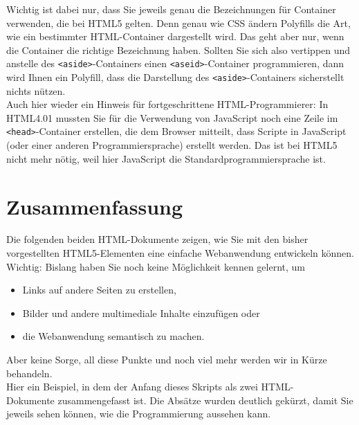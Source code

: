Wichtig ist dabei nur, dass Sie jeweils genau die Bezeichnungen für Container verwenden, die bei HTML5 gelten. Denn genau wie CSS ändern Polyfills die Art, wie ein bestimmter HTML-Container dargestellt wird. Das geht aber nur, wenn die Container die richtige Bezeichnung haben. Sollten Sie sich also vertippen und anstelle des \verb|<aside>|-Containers einen \verb|<aseid>|-Container programmieren, dann wird Ihnen ein Polyfill, dass die Darstellung des \verb|<aside>|-Containers sicherstellt nichts nützen.\\

Auch hier wieder ein Hinweis für fortgeschrittene HTML-Programmierer: In HTML4.01 mussten Sie für die Verwendung von JavaScript noch eine Zeile im \verb|<head>|-Container erstellen, die dem Browser mitteilt, dass \glqq{}Scripte\grqq{} in JavaScript (oder einer anderen Programmiersprache) erstellt werden. Das ist bei HTML5 nicht mehr nötig, weil hier JavaScript die Standardprogrammiersprache ist.

\section{Zusammenfassung}

Die folgenden beiden HTML-Dokumente zeigen, wie Sie mit den bisher vorgestellten HTML5-Elementen eine einfache Webanwendung entwickeln können. Wichtig: Bislang haben Sie noch keine Möglichkeit kennen gelernt, um

\begin{itemize}
	\item Links auf andere Seiten zu erstellen,
	\item Bilder und andere multimediale Inhalte einzufügen oder
	\item die Webanwendung semantisch zu machen.
\end{itemize}

Aber keine Sorge, all diese Punkte und noch viel mehr werden wir in Kürze behandeln.\\

Hier ein Beispiel, in dem der Anfang dieses Skripts als zwei HTML-\\Dokumente zusammengefasst ist. Die Absätze wurden deutlich gekürzt, damit Sie jeweils sehen können, wie die Programmierung aussehen kann.\\

